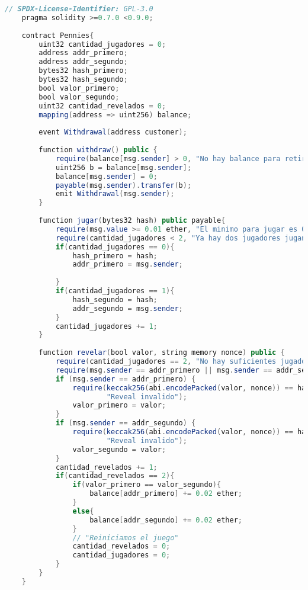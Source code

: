 \documentclass[12pt]{article}
\begin{document}
\begin{lstlisting}[language=Java]
    // SPDX-License-Identifier: GPL-3.0
    pragma solidity >=0.7.0 <0.9.0;
    
    contract Pennies{
        uint32 cantidad_jugadores = 0; 
        address addr_primero;
        address addr_segundo; 
        bytes32 hash_primero;
        bytes32 hash_segundo;
        bool valor_primero;
        bool valor_segundo;
        uint32 cantidad_revelados = 0;
        mapping(address => uint256) balance; 
    
        event Withdrawal(address customer);
    
        function withdraw() public {
            require(balance[msg.sender] > 0, "No hay balance para retirar");
            uint256 b = balance[msg.sender];
            balance[msg.sender] = 0;
            payable(msg.sender).transfer(b);
            emit Withdrawal(msg.sender);
        }
    
        function jugar(bytes32 hash) public payable{
            require(msg.value >= 0.01 ether, "El minimo para jugar es 0,01 eth"); // Si manda mas se lo queda la casa como donacion
            require(cantidad_jugadores < 2, "Ya hay dos jugadores jugando");
            if(cantidad_jugadores == 0){
                hash_primero = hash;
                addr_primero = msg.sender;
                
            }
            if(cantidad_jugadores == 1){
                hash_segundo = hash; 
                addr_segundo = msg.sender;
            }
            cantidad_jugadores += 1;
        }
    
        function revelar(bool valor, string memory nonce) public {
            require(cantidad_jugadores == 2, "No hay suficientes jugadores para revelar");
            require(msg.sender == addr_primero || msg.sender == addr_segundo, "No estas en la partida");
            if (msg.sender == addr_primero) {
                require(keccak256(abi.encodePacked(valor, nonce)) == hash_primero,
                        "Reveal invalido");
                valor_primero = valor;
            } 
            if (msg.sender == addr_segundo) {
                require(keccak256(abi.encodePacked(valor, nonce)) == hash_segundo,
                        "Reveal invalido");
                valor_segundo = valor;
            }
            cantidad_revelados += 1;
            if(cantidad_revelados == 2){
                if(valor_primero == valor_segundo){
                    balance[addr_primero] += 0.02 ether;  
                }
                else{
                    balance[addr_segundo] += 0.02 ether;
                }
                // "Reiniciamos el juego"
                cantidad_revelados = 0; 
                cantidad_jugadores = 0;
            }
        }
    }
\end{lstlisting}
\end{document}
